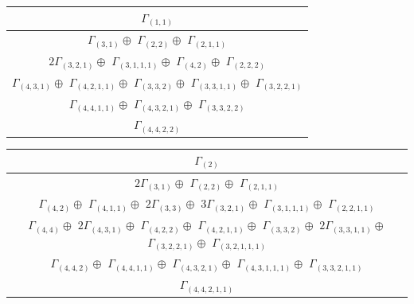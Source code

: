 \documentclass[main.tex]{subfiles}
\begin{document}
\begin{minipage}{1\textwidth}
\centering
\begin{tabular}{c}
$\Gamma_{(
1 , 
1
)}$
\\ \hline
$\Gamma_{(
3 , 
1
)} \oplus$
$\Gamma_{(
2 , 
2
)} \oplus$
$\Gamma_{(
2 , 
1 , 
1
)}$
\\ \hline
$ 2 \Gamma_{(
3 , 
2 , 
1
)} \oplus$
$\Gamma_{(
3 , 
1 , 
1 , 
1
)} \oplus$
$\Gamma_{(
4 , 
2
)} \oplus$
$\Gamma_{(
2 , 
2 , 
2
)}$
\\ \hline
$\Gamma_{(
4 , 
3 , 
1
)} \oplus$
$\Gamma_{(
4 , 
2 , 
1 , 
1
)} \oplus$
$\Gamma_{(
3 , 
3 , 
2
)} \oplus$
$\Gamma_{(
3 , 
3 , 
1 , 
1
)} \oplus$
$\Gamma_{(
3 , 
2 , 
2 , 
1
)}$
\\ \hline
$\Gamma_{(
4 , 
4 , 
1 , 
1
)} \oplus$
$\Gamma_{(
4 , 
3 , 
2 , 
1
)} \oplus$
$\Gamma_{(
3 , 
3 , 
2 , 
2
)}$
\\ \hline
$\Gamma_{(
4 , 
4 , 
2 , 
2
)}$
\\
\end{tabular}\end{minipage}
\bigskip
\begin{minipage}{1\textwidth}
\centering
\begin{tabular}{c}
$\Gamma_{(
2
)}$
\\ \hline
$ 2 \Gamma_{(
3 , 
1
)} \oplus$
$\Gamma_{(
2 , 
2
)} \oplus$
$\Gamma_{(
2 , 
1 , 
1
)}$
\\ \hline
$\Gamma_{(
4 , 
2
)} \oplus$
$\Gamma_{(
4 , 
1 , 
1
)} \oplus$
$ 2 \Gamma_{(
3 , 
3
)} \oplus$
$ 3 \Gamma_{(
3 , 
2 , 
1
)} \oplus$
$\Gamma_{(
3 , 
1 , 
1 , 
1
)} \oplus$
$\Gamma_{(
2 , 
2 , 
1 , 
1
)}$
\\ \hline
$\Gamma_{(
4 , 
4
)} \oplus$
$ 2 \Gamma_{(
4 , 
3 , 
1
)} \oplus$
$\Gamma_{(
4 , 
2 , 
2
)} \oplus$
$\Gamma_{(
4 , 
2 , 
1 , 
1
)} \oplus$
$\Gamma_{(
3 , 
3 , 
2
)} \oplus$
$ 2 \Gamma_{(
3 , 
3 , 
1 , 
1
)} \oplus$
$\Gamma_{(
3 , 
2 , 
2 , 
1
)} \oplus$
$\Gamma_{(
3 , 
2 , 
1 , 
1 , 
1
)}$
\\ \hline
$\Gamma_{(
4 , 
4 , 
2
)} \oplus$
$\Gamma_{(
4 , 
4 , 
1 , 
1
)} \oplus$
$\Gamma_{(
4 , 
3 , 
2 , 
1
)} \oplus$
$\Gamma_{(
4 , 
3 , 
1 , 
1 , 
1
)} \oplus$
$\Gamma_{(
3 , 
3 , 
2 , 
1 , 
1
)}$
\\ \hline
$\Gamma_{(
4 , 
4 , 
2 , 
1 , 
1
)}$
\\
\end{tabular}\end{minipage}
\bigskip
\end{document}
